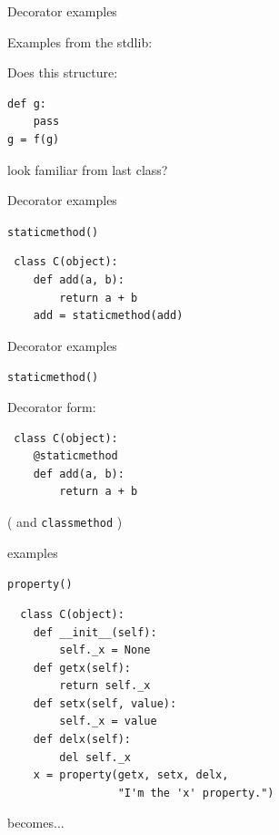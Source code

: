 \documentclass{beamer}
\begin{document}
\begin{frame}[fragile]{Decorator  examples}

{\LARGE Examples from the stdlib:}

\vfill
{\Large Does this structure:}

\vfill
\begin{verbatim}
def g:
    pass
g = f(g)
\end{verbatim}

\vfill

{\Large look familiar from last class?}
\end{frame} 

\begin{frame}[fragile]{Decorator examples}

{\LARGE \verb|staticmethod()|}

\vfill
\begin{verbatim}
￼class C(object):
    def add(a, b):
        return a + b
    add = staticmethod(add)
\end{verbatim}

\vfill

\end{frame} 

\begin{frame}[fragile]{Decorator examples}

{\LARGE \verb|staticmethod()|}

\vfill
{\Large Decorator form:}
\begin{verbatim}
￼class C(object):
    @staticmethod
    def add(a, b):
        return a + b
\end{verbatim}

\vfill

{\LARGE ( and \verb|classmethod| )}
\end{frame} 

\begin{frame}[fragile]{examples}

{\LARGE \verb|property()|}

\vfill
\begin{verbatim}
￼￼class C(object):
    def __init__(self):
        self._x = None
    def getx(self):
        return self._x
    def setx(self, value):
        self._x = value
    def delx(self):
        del self._x
    x = property(getx, setx, delx,
                 "I'm the 'x' property.")
\end{verbatim}

\vfill
{\large becomes...}
\end{frame} 
\end{document}
